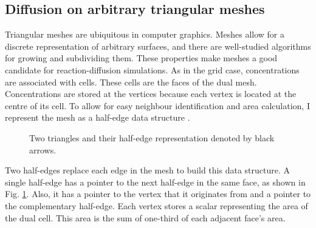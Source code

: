 \begin{figure}[H]
\centering
{}
\end{figure}

\subsection{Diffusion on arbitrary triangular meshes}
Triangular meshes are ubiquitous in computer graphics. Meshes allow for a discrete representation of arbitrary surfaces, and there are well-studied algorithms for growing and subdividing them. These properties make meshes a good candidate for reaction-diffusion simulations. As in the grid case, concentrations are associated with cells. These cells are the faces of the dual mesh. Concentrations are stored at the vertices because each vertex is located at the centre of its cell. To allow for easy neighbour identification and area calculation, I represent the mesh as a half-edge data structure \citep{marschner2015}.

\begin{figure}[H]
    \centering
    \caption{Two triangles and their half-edge representation denoted by black arrows.}
    \label{fig:halfEdgeMesh}
\end{figure}
Two half-edges replace each edge in the mesh to build this data structure. A single half-edge has a pointer to the next half-edge in the same face, as shown in Fig. \ref{fig:halfEdgeMesh}. Also, it has a pointer to the vertex that it originates from and a pointer to the complementary half-edge. Each vertex stores a scalar representing the area of the dual cell. This area is the sum of one-third of each adjacent face's area. %


